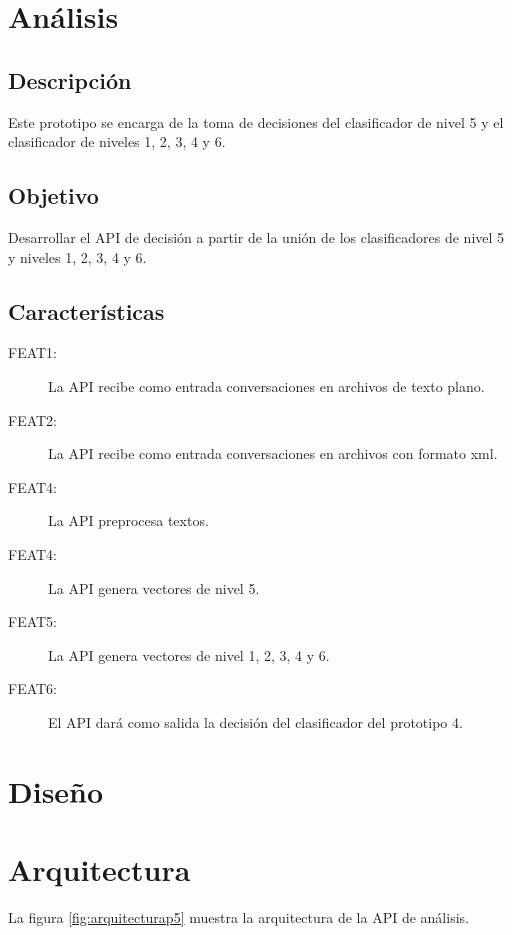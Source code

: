 \section{An\'alisis}

\subsection{Descripci\'on}
Este prototipo se encarga de la toma de decisiones del clasificador de nivel 5 y el clasificador de niveles  1, 2, 3, 4 y 6.

\subsection{Objetivo}
Desarrollar el API de decisi\'on a partir de la uni\'on de los clasificadores de nivel 5 y niveles 1, 2, 3, 4 y 6.

\subsection{Caracter\'isticas}
\begin{description}
\item[FEAT1:] La API recibe como entrada conversaciones en archivos de texto plano.
\item[FEAT2:] La API recibe como entrada conversaciones en archivos con formato xml.
\item[FEAT4:] La API preprocesa textos.
\item[FEAT4:] La API genera vectores de nivel 5.
\item[FEAT5:] La API genera vectores de nivel  1, 2, 3, 4 y 6.
\item[FEAT6:] El API dar\'a como salida la decisi\'on del clasificador del prototipo 4.

\end{description}

\section{Dise\~no}


\section{Arquitectura}

La figura \ref{fig:arquitecturap5} muestra la arquitectura de la API de an\'alisis.

